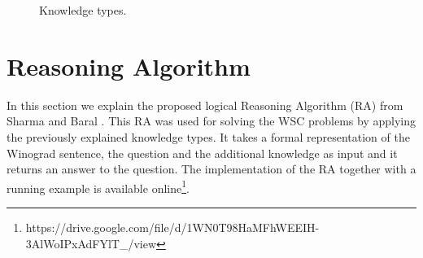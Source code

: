 \begin{figure} [h!]
	\centering
	
	\caption{\label{Ktypes} Knowledge types.}
\end{figure}
\pagebreak

\section{Reasoning Algorithm}
\label{RA}
In this section we explain the proposed logical Reasoning Algorithm (RA) from Sharma and Baral \cite{2018CommonsenseKT}. This RA was used for solving the WSC problems by applying the previously explained knowledge types. It takes a formal representation of the Winograd sentence, the question and the additional knowledge as input and it returns an answer to the question. The implementation of the RA together with a running example is available online\footnote{https://drive.google.com/file/d/1WN0T98HaMFhWEEIH-3AlWoIPxAdFYlT\_/view}. 

